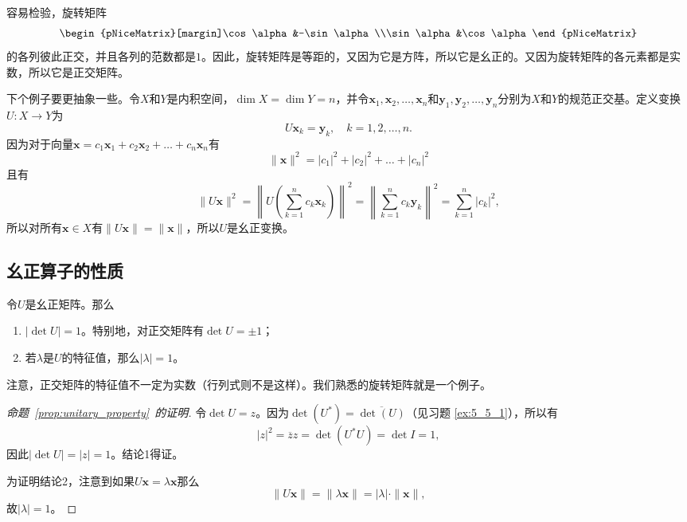 容易检验，旋转矩阵\[\begin{pNiceMatrix}[margin]\cos\alpha&-\sin\alpha\\\sin\alpha&\cos\alpha\end{pNiceMatrix}\]
的各列彼此正交，并且各列的范数都是$1$。因此，旋转矩阵是等距的，又因为它是方阵，所以它是幺正的。又因为旋转矩阵的各元素都是实数，所以它是正交矩阵。

下个例子要更抽象一些。令$X$和$Y$是内积空间，$\dim X=\dim Y=n$，并令$\mathbf{x}_{1},\mathbf{x}_{2},\ldots,\mathbf{x}_{n}$和$\mathbf{y}_1,\mathbf{y}_2,\ldots,\mathbf{y}_n$分别为$X$和$Y$的规范正交基。定义变换$U:X\to Y$为
\[U\mathbf{x}_{k}=\mathbf{y}_{k},\quad k=1,2,\ldots,n.\]
因为对于向量$\mathbf{x}=c_1\mathbf{x}_1+c_2\mathbf{x}_2+\ldots+c_n\mathbf{x}_n$有
\[\|\mathbf{x}\|^{2}=|c_{1}|^{2}+|c_{2}|^{2}+\ldots+|c_{n}|^{2}\]
且有\[\|U\mathbf{x}\|^{2}=\left\|U\left(\sum_{k=1}^{n}c_{k}\mathbf{x}_{k}\right)\right\|^{2}=\left\|\sum_{k=1}^{n}c_{k}\mathbf{y}_{k}\right\|^{2}=\sum_{k=1}^{n}|c_{k}|^{2},\]
所以对所有$\mathbf{x}\in X$有$\|U\mathbf{x}\|=\|\mathbf{x}\|$，所以$U$是幺正变换。

\subsection{幺正算子的性质}

\begin{proposition}\label{prop:unitary_property}
    令$U$是幺正矩阵。那么
    \begin{enumerate}
        \item $|\det U|=1$。特别地，对正交矩阵有$\det U=\pm 1$；
        \item 若$\lambda$是$U$的特征值，那么$|\lambda|=1$。
    \end{enumerate}
\end{proposition}
\begin{remark*}
    注意，正交矩阵的特征值不一定为实数（行列式则不是这样）。我们熟悉的旋转矩阵就是一个例子。
\end{remark*}

\begin{proof}[命题~\ref{prop:unitary_property}~的证明]
    令$\det U=z$。因为$\det(U^*)=\overline{\det(U)}$（见习题 \ref{ex:5_5_1}），所以有\[|z|^2=\overline{z}z=\det(U^*U)=\det I=1,\]
    因此$|\det U|=|z|=1$。结论1得证。

    为证明结论2，注意到如果$U\mathbf{x}=\lambda\mathbf{x}$那么
    \[\|U\mathbf{x}\|=\|\lambda\mathbf{x}\|=|\lambda|\cdot\|\mathbf{x}\|,\]
    故$|\lambda|=1$。
\end{proof}

